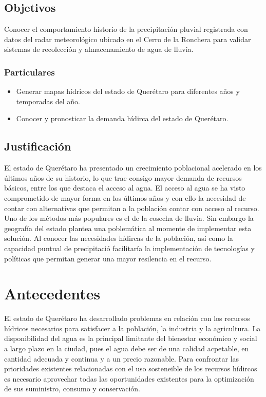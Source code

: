 \documentclass[letterpaper,12pt,oneside]{book}
\begin{document}
    \section{Objetivos}
        Conocer el comportamiento historio de la precipitación pluvial registrada con datos del radar meteorológico ubicado en el Cerro de la Ronchera para validar sistemas de recolección y almacenamiento de agua de lluvia.
        \subsection{Particulares}
            \begin{itemize}
                \item Generar mapas hídricos del estado de Querétaro para diferentes años y temporadas del año.
                \item Conocer y pronosticar la demanda hídirca del estado de Querétaro.
            \end{itemize}

    \section{Justificación}
        El estado de Querétaro ha presentado un crecimiento poblacional acelerado en los últimos años de su historio, lo que trae consigo mayor demanda de recursos básicos, entre los que destaca el acceso al agua. 
        El acceso al agua se ha visto comprometido de mayor forma en los últimos años y con ello la necesidad de contar con alternativas que permitan a la población contar con acceso al recurso. Uno de los métodos más populares es el de la cosecha de lluvia. Sin embargo la geografía del estado plantea una poblemática al momente de implementar esta solución.
        Al conocer las necesidades hídircas de la población, así como la capacidad puntual de precipitació facilitaría la implementación de tecnologías y políticas que permitan generar una mayor resilencia en el recurso.
\newpage
\chapter*{Antecedentes} 
    El estado de Querétaro ha desarrollado problemas en relación con los recursos hídricos necesarios para satisfacer a la población, la industria y la agricultura. La disponibilidad del agua es la principal limitante del bienestar económico y social a largo plazo en la ciudad, pues el agua debe ser de una calidad acpetable, en cantidad adecuada y continua y a un precio razonable. Para confrontar las prioridades existentes relacionadas con el uso sosteneible de los recursos hídircos es necesario aprovechar todas las oportunidades existentes para la optimización de sus suministro, consumo y conservación.
\end{document}
